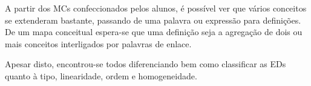A partir dos MCs confeccionados pelos alunos, é possível ver que vários conceitos se extenderam bastante, passando de uma palavra ou expressão para definições. De um mapa conceitual espera-se que uma definição seja a agregação de dois ou mais conceitos interligados por palavras de enlace.

Apesar disto, encontrou-se todos diferenciando bem como classificar as EDs quanto à tipo, linearidade, ordem e homogeneidade.

 

